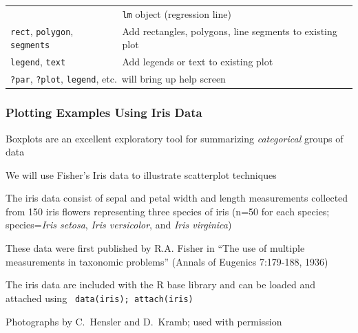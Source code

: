 \documentclass[10pt]{beamer}
\begin{document}
\begin{frame}[fragile]
{\begin{center}
\begin{tabular}{ll}
                 & \hspace{2ex} {\color{red} \tt lm} object (regression line)\\
{\color{red} \tt rect}, {\color{red} \tt polygon}, {\color{red} \tt segments}
                & Add rectangles, polygons, line segments to existing plot\\
 {\color{red} \tt legend}, {\color{red} \tt text}
                & Add legends or text to existing plot\\ \hline
\multicolumn{2}{l}{{\color{red} \tt ?par}, {\color{red} \tt ?plot},
  {\color{red} \tt legend}, etc.~will bring up help screen}\\
\end{tabular}



\end{center}
}
\end{frame}


\begin{frame}[fragile]
\frametitle{Plotting Examples Using Iris Data}
\begin{center}
\end{center}

\bi
{\scriptsize
\item Boxplots are an excellent exploratory tool
  for summarizing {\em categorical} groups of data

\item We will use Fisher's Iris data to illustrate scatterplot
  techniques

\item The iris data consist of sepal and petal width and length
  measurements collected from 150 iris flowers representing three
  species of iris (n=50 for each species; species={\em Iris setosa},
  {\em Iris versicolor}, and {\em Iris virginica})
\item These data were first published by R.A. Fisher in ``The use of
  multiple measurements in taxonomic problems'' (Annals of Eugenics
  7:179-188, 1936)
\item The iris data are included with the R base library and can be
  loaded and attached using {\tt \color{red} data(iris);
    attach(iris)}\\} \ei

{\tiny Photographs by C.~Hensler and D.~Kramb; used with permission}

\end{frame}
\end{document}
